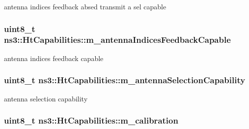 antenna indices feedback absed transmit a sel capable 

\subsubsection[{\texorpdfstring{m\+\_\+antenna\+Indices\+Feedback\+Capable}{m_antennaIndicesFeedbackCapable}}]{\setlength{\rightskip}{0pt plus 5cm}uint8\+\_\+t ns3\+::\+Ht\+Capabilities\+::m\+\_\+antenna\+Indices\+Feedback\+Capable\hspace{0.3cm}{\ttfamily [private]}}\hypertarget{classns3_1_1HtCapabilities_acdcdd4c167f12e39628a4bd07c74480a}{}\label{classns3_1_1HtCapabilities_acdcdd4c167f12e39628a4bd07c74480a}


antenna indices feedback capable 

\subsubsection[{\texorpdfstring{m\+\_\+antenna\+Selection\+Capability}{m_antennaSelectionCapability}}]{\setlength{\rightskip}{0pt plus 5cm}uint8\+\_\+t ns3\+::\+Ht\+Capabilities\+::m\+\_\+antenna\+Selection\+Capability\hspace{0.3cm}{\ttfamily [private]}}\hypertarget{classns3_1_1HtCapabilities_ac03df8c351fc6f4f3d79264dca618f9e}{}\label{classns3_1_1HtCapabilities_ac03df8c351fc6f4f3d79264dca618f9e}


antenna selection capability 

\subsubsection[{\texorpdfstring{m\+\_\+calibration}{m_calibration}}]{\setlength{\rightskip}{0pt plus 5cm}uint8\+\_\+t ns3\+::\+Ht\+Capabilities\+::m\+\_\+calibration\hspace{0.3cm}{\ttfamily [private]}}\hypertarget{classns3_1_1HtCapabilities_a0176690dd0f5fd9568b4a8df0f2a587f}{}\label{classns3_1_1HtCapabilities_a0176690dd0f5fd9568b4a8df0f2a587f}


